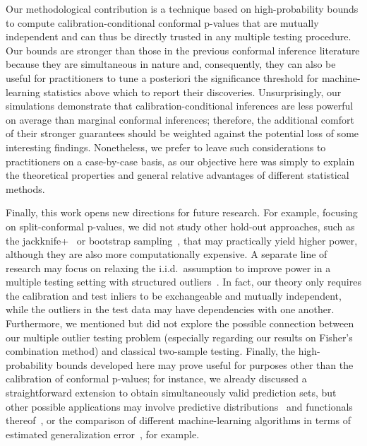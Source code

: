 Our methodological contribution is a technique based on high-probability bounds to compute calibration-conditional conformal p-values that are mutually independent and can thus be directly trusted in any multiple testing procedure. Our bounds are stronger than those in the previous conformal inference literature because they are simultaneous in nature and, consequently, they can also be useful for practitioners to tune a posteriori the significance threshold for machine-learning statistics above which to report their discoveries.
Unsurprisingly, our simulations demonstrate that calibration-conditional inferences are less powerful on average than marginal conformal inferences; therefore, the additional comfort of their stronger guarantees should be weighted against the potential loss of some interesting findings. Nonetheless, we prefer to leave such considerations to practitioners on a case-by-case basis, as our objective here was simply to explain the theoretical properties and general relative advantages of different statistical methods.

Finally, this work opens new directions for future research. For example, focusing on split-conformal p-values, we did not study other hold-out approaches, such as the jackknife+~\cite{barber2019predictive} or bootstrap sampling~\cite{kim2020predictive}, that may practically yield higher power, although they are also more {computationally expensive}. A separate line of research may focus on relaxing the i.i.d.~assumption to improve power in a multiple testing setting with structured outliers~\cite{li2019multiple}. In fact, our theory only requires the calibration and test inliers to be exchangeable and mutually independent, while the outliers in the test data may have dependencies with one another.
Furthermore, we mentioned but did not explore the possible connection between our multiple outlier testing problem (especially regarding our results on Fisher's combination method) and classical two-sample testing. Finally, the high-probability bounds developed here may prove useful for purposes other than the calibration of conformal p-values; for instance, we already discussed a straightforward extension to obtain simultaneously valid prediction sets, but other possible applications may involve predictive distributions~\cite{vovk2018cross} and functionals thereof~\cite{wisniewski2020application}, or the comparison of different machine-learning algorithms in terms of estimated generalization error~\cite{holland2020making,Bayle2020}, for example.


